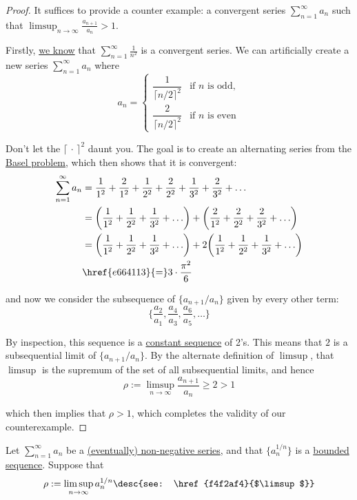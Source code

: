 \begin{proof}
  It suffices to provide a counter example: a convergent series
  $\sum_{n=1}^\infty a_n$ such that $\limsup_{n\to\infty}\frac{a_{n+1}}{a_n}>1$.

  Firstly, \href{e664113}{we know} that $\sum_{n=1}^\infty\frac1{n^2}$ is a
  convergent series. We can artificially create a new series $\sum_{n=1}^\infty
  a_n$ where
  $$
    a_n=\begin{cases}
      \dfrac1{\lceil n/2\rceil^2} & \text{if $n$ is odd}, \\[1em]
      \dfrac2{\lceil n/2\rceil^2} & \text{if $n$ is even}
    \end{cases}
  $$

  Don't let the $\lceil\,\cdot\,\rceil^2$ daunt you. The goal is to create an
  alternating series from the \href{e664113}{Basel problem}, which then shows
  that it is convergent:
  \begin{align*}
    \sum_{n=1}^\infty a_n &=\frac1{1^2}+\frac2{1^2}+\frac1{2^2}+\frac2{2^2}+\frac1{3^2}+\frac2{3^2}+\ldots                                     \\
                          &=\biggl(\frac1{1^2}+\frac1{2^2}+\frac1{3^2}+\ldots\biggr)+\biggl(\frac2{1^2}+\frac2{2^2}+\frac2{3^2}+\ldots\biggr)  \\
                          &=\biggl(\frac1{1^2}+\frac1{2^2}+\frac1{3^2}+\ldots\biggr)+2\biggl(\frac1{1^2}+\frac1{2^2}+\frac1{3^2}+\ldots\biggr) \\
                          &\href{e664113}{=}3\cdot\frac{\pi^2}6
  \end{align*}

  and now we consider the subsequence of $\{a_{n+1}/a_n\}$ given by every other
  term:
  $$
    \biggl\{\frac{a_2}{a_1},\frac{a_4}{a_3},\frac{a_6}{a_5},\ldots\biggr\}
  $$

  By inspection, this sequence is a \href{d661313}{constant sequence} of 2's.
  This means that $2$ is a subsequential limit of $\{a_{n+1}/a_n\}$. By the
  alternate definition of \href{f4f2af4}{$\limsup$}, that $\limsup$ is the
  supremum of the set of all subsequential limits, and hence
  $$
    \rho:=\limsup_{n\to\infty}\frac{a_{n+1}}{a_n}\geq2>1
  $$

  which then implies that $\rho>1$, which completes the validity of our
  counterexample.
\end{proof}

\label{d2ba8bd}

Let $\sum_{n=1}^\infty a_n$ be a \href{b6cffeb}{(eventually) non-negative
series}, and that $\{a^{1/n}_n\}$ is a \href{d5ed299}{bounded sequence}.
Suppose that
$$
  \rho:=\limsup_{n\to\infty}a^{1/n}_n\desc{see: \href{f4f2af4}{$\limsup$}}
$$

